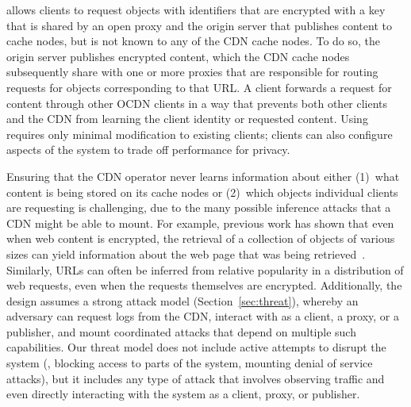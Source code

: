 \system{} allows clients to request objects with identifiers that
are encrypted with a key that is shared by an open proxy and the origin server
that publishes content to cache nodes, but is not known to any of the CDN
cache nodes.  To do so, the origin server publishes encrypted content, 
which the CDN cache nodes subsequently share with one or more proxies that are responsible
for
routing requests for objects corresponding to that URL.  A client forwards a
request for content through other OCDN clients in a way
that prevents both other clients and the CDN from learning the client
identity or requested content.  Using \system{} requires only minimal modification to existing clients; clients can also configure aspects of the system to trade off performance for privacy.

Ensuring that the CDN operator never learns information about either (1)~what
content is being stored on its cache nodes or (2)~which objects individual
clients are requesting is challenging, due to the many possible inference
attacks that a CDN might be able to mount. For example, previous work has
shown that even when web content is encrypted, the retrieval of a collection
of objects of various sizes can yield information about the web page that was
being retrieved~\cite{panchenko2016website, cai2012touching}. Similarly, URLs
can often be inferred from relative popularity in a distribution of web
requests, even when the requests themselves are encrypted. Additionally, the
\system{} design assumes a strong attack model (Section~\ref{sec:threat}),
whereby an adversary can request logs from the CDN, interact with \system{} as
a client, a proxy, or a publisher, and mount coordinated attacks that depend on
multiple such capabilities. Our threat model does not include active attempts
to disrupt the system (\eg, blocking access to parts of the system, mounting
denial of service attacks), but it includes any type of attack
that involves observing traffic and even directly interacting with the system
as a client, proxy, or publisher.

